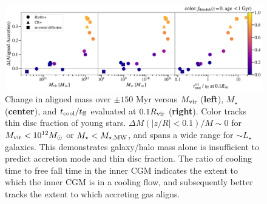 \documentclass[fleqn,usenatbib]{mnras}
\begin{document}
\begin{figure}
    \centering
    \includegraphics[width=\textwidth]{figures/prevalence/aligned_fraction_vs_galaxy_props.pdf}
    \caption{
    Change in aligned mass over $\pm 150$ Myr versus $M_{\rm vir}$ (\textbf{left}), $M_\star$ (\textbf{center}), and $t_{\rm cool}/t_{\rm ff}$ evaluated at $0.1 R_{\rm vir}$ (\textbf{right}).
    Color tracks thin disc fraction of young stars.
    $\Delta M(\mid z/R \mid<0.1)/M \sim 0$ for $M_{\rm vir} < 10^{12} M_\odot$ or $M_\star < M_{\star, {\rm MW}}$, and spans a wide range for $\sim L_\star$ galaxies.
    This demonstrates galaxy/halo mass alone is insufficient to predict accretion mode and thin disc fraction.
    The ratio of cooling time to free fall time in the inner CGM indicates the extent to which the inner CGM is in a cooling flow, and subsequently better tracks the extent to which accreting gas aligns.
    }
    \label{f: prevalence vs galaxy properties}
\end{figure}
\end{document}
